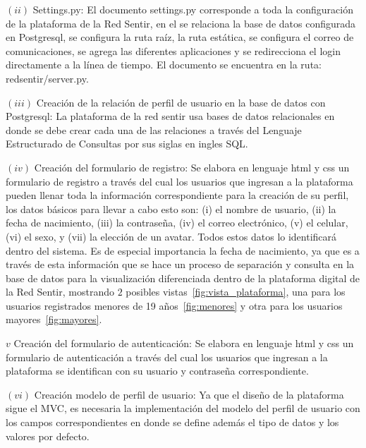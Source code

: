 \documentclass[journal,transmag]{IEEEtran}
\begin{document}
$(ii)$ Settings.py: El documento settings.py corresponde a toda la configuración de la plataforma de la Red Sentir, en el se relaciona la base de datos configurada en Postgresql, se configura la ruta raíz, la ruta estática, se configura el correo de comunicaciones, se agrega las diferentes aplicaciones y se redirecciona el login directamente a la línea de tiempo. El documento se encuentra en la ruta: redsentir/server.py.

$(iii)$ Creación de la relación de perfil de usuario en la base de datos con Postgresql: La plataforma de la red sentir usa bases de datos relacionales en donde se debe crear cada una de las relaciones a través del Lenguaje Estructurado de Consultas por sus siglas en ingles SQL.

$(iv)$ Creación del formulario de registro: Se elabora en lenguaje html y css un formulario de registro a través del cual los usuarios que ingresan a la plataforma pueden llenar toda la información correspondiente para la creación de su perfil, los datos básicos para llevar a cabo esto son: (i) el nombre de usuario, (ii) la fecha de nacimiento, (iii) la contraseña, (iv) el correo electrónico, (v) el celular, (vi) el sexo, y (vii) la elección de un avatar. Todos estos datos lo identificará dentro del sistema. Es de especial importancia la fecha de nacimiento, ya que es a través de esta información que se hace un proceso de separación y consulta en la base de datos para la visualización diferenciada dentro de la plataforma digital de la Red Sentir, mostrando $2$ posibles vistas~\ref{fig:vista_plataforma}, una para los usuarios registrados menores de 19 años~\ref{fig:menores} y otra para los usuarios mayores~\ref{fig:mayores}.

$v$ Creación del formulario de autenticación: Se elabora en lenguaje html y css un formulario de autenticación a través del cual los usuarios que ingresan a la plataforma se identifican con su usuario y contraseña correspondiente.

$(vi)$ Creación modelo de perfil de usuario: Ya que el diseño de la plataforma sigue el MVC, es necesaria la implementación del modelo del perfil de usuario con los campos correspondientes en donde se define además el tipo de datos y los valores por defecto.
\end{document}
